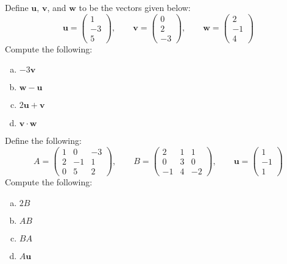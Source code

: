 \documentclass[11pt,letterpaper]{article}
\begin{document}

 Define $\mathbf{u}$, $\mathbf{v}$, and $\mathbf{w}$ to be the vectors given below:
	\[
	\mathbf{u}= \begin{pmatrix} 1 \\ -3 \\ 5 \end{pmatrix}, \qquad \mathbf{v}= \begin{pmatrix} 0 \\ 2 \\ -3 \end{pmatrix}, \qquad \mathbf{w}= \begin{pmatrix} 2 \\ -1 \\ 4 \end{pmatrix}
	\]
Compute the following:
	\begin{enumerate}[(a)]
	\item $-3 \mathbf{v}$
	\item $\mathbf{w} - \mathbf{u}$
	\item $2\mathbf{u} + \mathbf{v}$
	\item $\mathbf{v} \cdot \mathbf{w}$
	\end{enumerate}



\newpage



 Define the following:
	\[
	A= \begin{pmatrix} 1 & 0 & -3 \\ 2 & -1 & 1 \\ 0 & 5 & 2 \end{pmatrix}, \qquad
	B= \begin{pmatrix} 2 & 1 & 1 \\ 0 & 3 & 0 \\ -1 & 4 & -2 \end{pmatrix}, \qquad
	\mathbf{u}= \begin{pmatrix} 1 \\ -1 \\ 1 \end{pmatrix}
	\]
Compute the following:
	\begin{enumerate}[(a)]
	\item $2B$
	\item $AB$
	\item $BA$
	\item $A \mathbf{u}$
	\end{enumerate}
\end{document}

